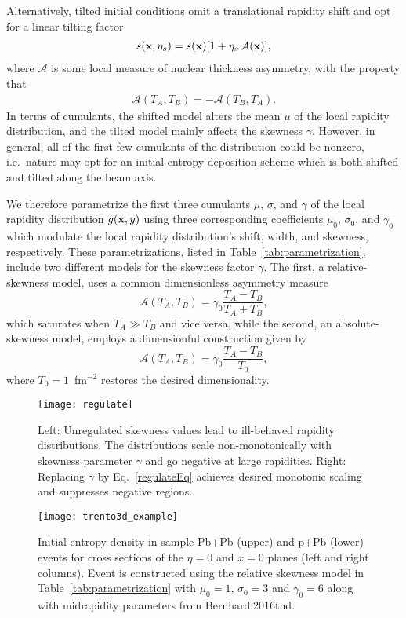 Alternatively, tilted initial conditions omit a translational rapidity shift and opt for a linear tilting factor
\begin{align}
  s(\mathbf x, \eta_s) = s(\mathbf x) [1+\eta_s\, \mathcal{A}(\mathbf x)],
\end{align}
where $\mathcal{A}$ is some local measure of nuclear thickness asymmetry, with the property that
\begin{align}\label{asym}
  \mathcal{A}(T_A, T_B) = -\mathcal{A}(T_B, T_A).
\end{align}
In terms of cumulants, the shifted model alters the mean $\mu$ of the local rapidity distribution, and the tilted model mainly affects the skewness $\gamma$.
However, in general, all of the first few cumulants of the distribution could be nonzero, i.e.\ nature may opt for an initial entropy deposition scheme which is both shifted and tilted along the beam axis.

We therefore parametrize the first three cumulants $\mu$, $\sigma$, and $\gamma$ of the local rapidity distribution $g(\mathbf x, y)$ using three corresponding coefficients $\mu_0$, $\sigma_0$, and $\gamma_0$ which modulate the local rapidity distribution's shift, width, and skewness, respectively.
These parametrizations, listed in Table~\ref{tab:parametrization}, include two different models for the skewness factor $\gamma$.
The first, a relative-skewness model, uses a common dimensionless asymmetry measure
\begin{equation}
  \mathcal{A}(T_A, T_B) = \gamma_0\frac{T_A - T_B}{T_A + T_B},
\end{equation}
which saturates when $T_A \gg T_B$ and vice versa, while the second, an absolute-skewness model, employs a dimensionful construction given by
\begin{equation}
  \mathcal{A}(T_A, T_B) = \gamma_0 \frac{T_A - T_B}{T_0},
\end{equation}
where $T_0=1$~fm$^{-2}$ restores the desired dimensionality.

\begin{figure}[t]
  \texttt{[image: regulate]}
  \caption{Left: Unregulated skewness values lead to ill-behaved rapidity distributions. The distributions scale non-monotonically with skewness parameter $\gamma$ and go negative at large rapidities. Right: Replacing $\gamma$ by Eq.~\eqref{regulateEq} achieves desired monotonic scaling and suppresses negative regions.}
  \label{fig:regulate}
\end{figure}

\begin{figure}[b]
  \texttt{[image: trento3d\_example]}
  \caption{Initial entropy density in sample Pb+Pb (upper) and p+Pb (lower) events for cross sections of the $\eta=0$ and $x=0$ planes (left and right columns). Event is constructed using the relative skewness model in Table~\ref{tab:parametrization} with $\mu_0=1$, $\sigma_0=3$ and $\gamma_0=6$ along with midrapidity parameters from {Bernhard:2016tnd}.}
  \label{fig:3d-example}
\end{figure}

